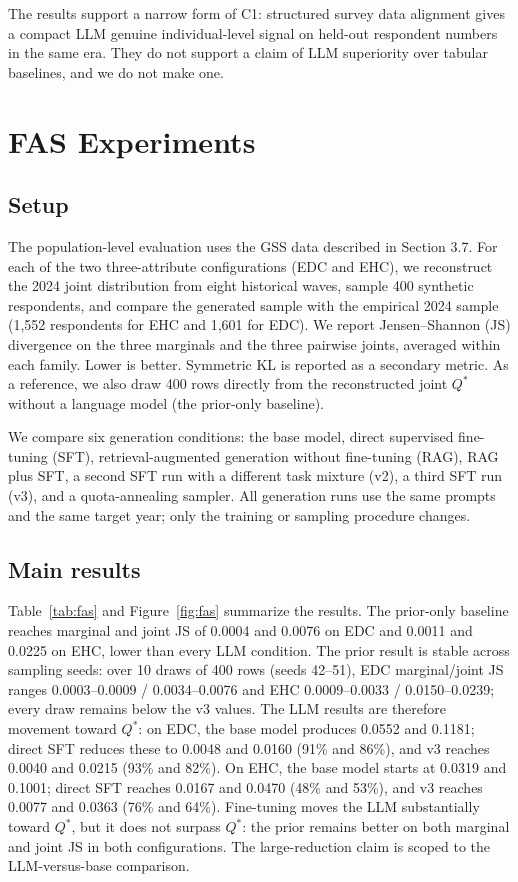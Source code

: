 The results support a narrow form of C1: structured survey data
alignment gives a compact LLM genuine individual-level signal on
held-out respondent numbers in the same era. They do not support a claim
of LLM superiority over tabular baselines, and we do not make one.

\section{FAS Experiments}\label{fas-experiments}

\subsection{Setup}\label{setup-1}

The population-level evaluation uses the GSS data described in Section
3.7. For each of the two three-attribute configurations (EDC and EHC),
we reconstruct the 2024 joint distribution from eight historical waves,
sample 400 synthetic respondents, and compare the generated sample with
the empirical 2024 sample (1,552 respondents for EHC and 1,601 for EDC).
We report Jensen--Shannon (JS) divergence on the three marginals and the
three pairwise joints, averaged within each family. Lower is better.
Symmetric KL is reported as a secondary metric. As a reference, we also
draw 400 rows directly from the reconstructed joint \(Q^{\ast}\) without
a language model (the prior-only baseline).

We compare six generation conditions: the base model, direct supervised
fine-tuning (SFT), retrieval-augmented generation without fine-tuning
(RAG), RAG plus SFT, a second SFT run with a different task mixture
(v2), a third SFT run (v3), and a quota-annealing sampler. All
generation runs use the same prompts and the same target year; only the
training or sampling procedure changes.

\subsection{Main results}\label{main-results}

Table~\ref{tab:fas} and Figure~\ref{fig:fas} summarize the results. The prior-only baseline
reaches marginal and joint JS of 0.0004 and 0.0076 on EDC and 0.0011 and
0.0225 on EHC, lower than every LLM condition. The prior result is
stable across sampling seeds: over 10 draws of 400 rows (seeds 42--51),
EDC marginal/joint JS ranges 0.0003--0.0009 / 0.0034--0.0076 and EHC
0.0009--0.0033 / 0.0150--0.0239; every draw remains below the v3 values.
The LLM results are therefore movement toward \(Q^{\ast}\): on EDC, the
base model produces 0.0552 and 0.1181; direct SFT reduces these to
0.0048 and 0.0160 (91\% and 86\%), and v3 reaches 0.0040 and 0.0215
(93\% and 82\%). On EHC, the base model starts at 0.0319 and 0.1001;
direct SFT reaches 0.0167 and 0.0470 (48\% and 53\%), and v3 reaches
0.0077 and 0.0363 (76\% and 64\%). Fine-tuning moves the LLM
substantially toward \(Q^{\ast}\), but it does not surpass \(Q^{\ast}\):
the prior remains better on both marginal and joint JS in both
configurations. The large-reduction claim is scoped to the
LLM-versus-base comparison.

